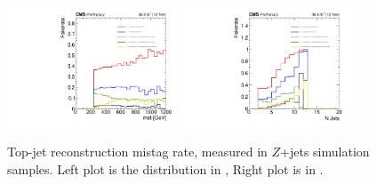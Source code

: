 \begin{figure}[htbp]
 \begin{center}
  \includegraphics[width=0.45\textwidth]{sections/mc4/TopTagger/figures/baseline_fakerate_met_tight.pdf}
  \includegraphics[width=0.45\textwidth]{sections/mc4/TopTagger/figures/baseline_fakerate_njet_tight.pdf}
 \end{center} \caption{Top-jet reconstruction mistag rate, measured in $Z$+jets simulation samples. Left plot is the distribution in \MET, Right plot is in \njets.}
 \label{fig:c4ttmistagtight}
\end{figure}
